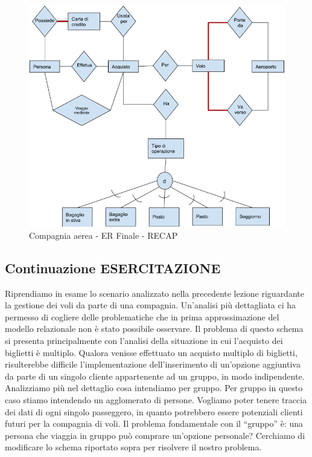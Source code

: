 \begin{center}
\begin{figure}[H]
\centering
\includegraphics[scale=0.7]{figures/compagnia_aerea2.png}
\caption{Compagnia aerea - ER Finale - RECAP}
\end{figure}
\end{center}


\subsection{Continuazione ESERCITAZIONE}

Riprendiamo in esame lo scenario analizzato nella precedente lezione riguardante la gestione dei voli da parte di una compagnia.  Un’analisi più dettagliata ci ha permesso di cogliere delle problematiche che in prima approssimazione del modello relazionale non è stato possibile osservare. Il problema di questo schema si presenta principalmente con l’analisi della situazione in cui l’acquisto dei biglietti è multiplo. Qualora venisse effettuato un acquisto multiplo di biglietti, risulterebbe difficile l’implementazione dell’inserimento di un’opzione aggiuntiva da parte di un singolo cliente appartenente ad un gruppo, in modo indipendente.  Analizziamo più nel dettaglio cosa intendiamo per gruppo. Per gruppo in questo caso stiamo intendendo un agglomerato di persone. Vogliamo poter tenere traccia dei dati di ogni singolo passeggero, in quanto potrebbero essere potenziali clienti futuri per la compagnia di voli. Il problema fondamentale con il “gruppo” è: una persona che viaggia in gruppo può comprare un’opzione personale? Cerchiamo di modificare lo schema riportato sopra per risolvere il nostro problema.  

